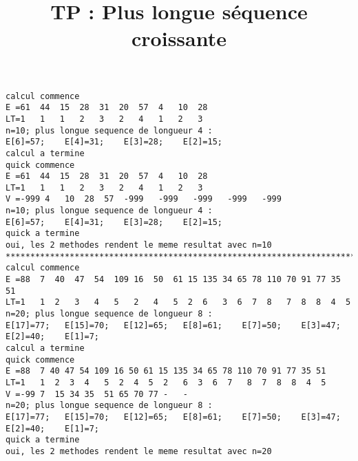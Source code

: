 \documentclass[a4paper]{article}
\begin{document}
\date{}
\title{TP : Plus longue s\'equence croissante}
\maketitle

\begin{verbatim}
calcul commence
E =61  44  15  28  31  20  57  4   10  28
LT=1   1   1   2   3   2   4   1   2   3
n=10; plus longue sequence de longueur 4 :
E[6]=57;    E[4]=31;    E[3]=28;    E[2]=15; 
calcul a termine
quick commence
E =61  44  15  28  31  20  57  4   10  28
LT=1   1   1   2   3   2   4   1   2   3
V =-999 4   10  28  57  -999   -999   -999   -999   -999
n=10; plus longue sequence de longueur 4 :
E[6]=57;    E[4]=31;    E[3]=28;    E[2]=15; 
quick a termine
oui, les 2 methodes rendent le meme resultat avec n=10
********************************************************************************************
calcul commence
E =88  7  40  47  54  109 16  50  61 15 135 34 65 78 110 70 91 77 35 51
LT=1   1  2   3   4   5   2   4   5  2  6   3  6  7  8   7  8  8  4  5
n=20; plus longue sequence de longueur 8 :
E[17]=77;   E[15]=70;   E[12]=65;   E[8]=61;    E[7]=50;    E[3]=47;    E[2]=40;    E[1]=7; 
calcul a termine
quick commence
E =88  7 40 47 54 109 16 50 61 15 135 34 65 78 110 70 91 77 35 51
LT=1   1  2  3  4   5  2  4  5  2   6  3  6  7   8  7  8  8  4  5
V =-99 7  15 34 35  51 65 70 77 -   -  
n=20; plus longue sequence de longueur 8 :
E[17]=77;   E[15]=70;   E[12]=65;   E[8]=61;    E[7]=50;    E[3]=47;    E[2]=40;    E[1]=7; 
quick a termine
oui, les 2 methodes rendent le meme resultat avec n=20
\end{verbatim}
\end{document}
